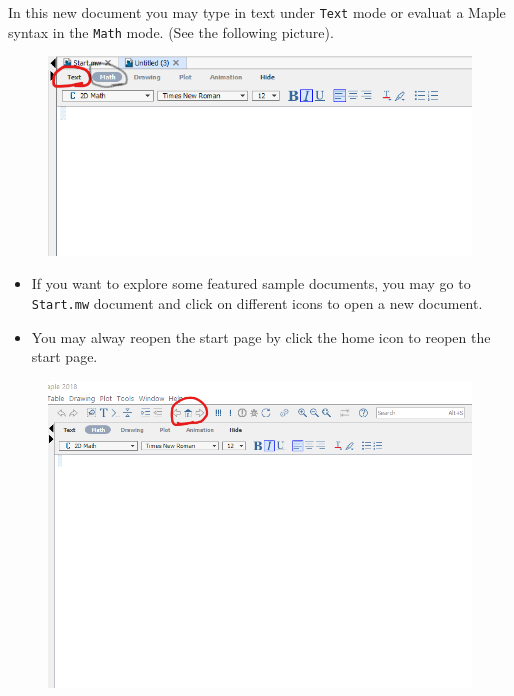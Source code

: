 \documentclass[]{book}
\theoremstyle{definition}
\theoremstyle{definition}
\theoremstyle{definition}
\theoremstyle{remark}
\begin{document}
In this new document you may type in text under \texttt{Text} mode or
evaluat a Maple syntax in the \texttt{Math} mode. (See the following
picture).

\begin{figure}
\centering
\includegraphics{figs/Text-Math-Mode.png}
\caption{}
\end{figure}

\begin{itemize}
\item
  If you want to explore some featured sample documents, you may go to
  \texttt{Start.mw} document and click on different icons to open a new
  document.
\item
  You may alway reopen the start page by click the home icon to reopen
  the start page.
\end{itemize}

\begin{figure}
\centering
\includegraphics{figs/Home-reopen-start-page.png}
\caption{}
\end{figure}
\end{document}
